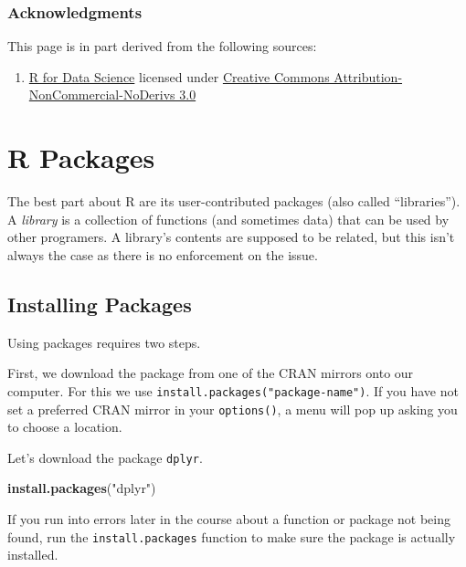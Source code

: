 \documentclass[]{book}
\newenvironment{Shaded}{\begin{snugshade}}{\end{snugshade}}
\newcommand{\KeywordTok}[1]{\textcolor[rgb]{0.13,0.29,0.53}{\textbf{#1}}}
\newcommand{\StringTok}[1]{\textcolor[rgb]{0.31,0.60,0.02}{#1}}
\newcommand{\NormalTok}[1]{#1}
\providecommand{\tightlist}{%
  \setlength{\itemsep}{0pt}\setlength{\parskip}{0pt}}
\begin{document}
\subsubsection*{Acknowledgments}\label{acknowledgments-1}

This page is in part derived from the following sources:

\begin{enumerate}
\def\labelenumi{\arabic{enumi}.}
\tightlist
\item
  \href{https://r4ds.had.co.nz}{R for Data Science} licensed under
  \href{https://creativecommons.org/licenses/by-nc-nd/3.0/us/}{Creative
  Commons Attribution-NonCommercial-NoDerivs 3.0}
\end{enumerate}

\hypertarget{r-packages-1}{\section{R Packages}\label{r-packages-1}}

The best part about R are its user-contributed packages (also called
``libraries''). A \emph{library} is a collection of functions (and
sometimes data) that can be used by other programers. A library's
contents are supposed to be related, but this isn't always the case as
there is no enforcement on the issue.

\subsection{Installing Packages}\label{installing-packages}

Using packages requires two steps.

First, we download the package from one of the CRAN mirrors onto our
computer. For this we use \texttt{install.packages("package-name")}. If
you have not set a preferred CRAN mirror in your \texttt{options()}, a
menu will pop up asking you to choose a location.

Let's download the package \texttt{dplyr}.

\begin{Shaded}
\begin{Highlighting}[]
\KeywordTok{install.packages}\NormalTok{(}\StringTok{"dplyr"}\NormalTok{)}
\end{Highlighting}
\end{Shaded}

If you run into errors later in the course about a function or package
not being found, run the \texttt{install.packages} function to make sure
the package is actually installed.
\end{document}
